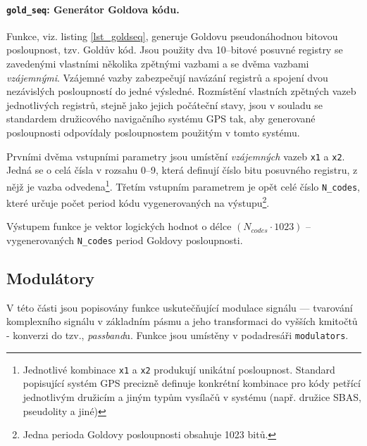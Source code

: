

\paragraph{\texttt{gold\_seq}: Generátor Goldova kódu.}
Funkce, viz. listing \ref{lst_goldseq}, generuje Goldovu pseudonáhodnou bitovou posloupnost, tzv. Goldův kód. Jsou použity dva 10--bitové posuvné registry se zavedenými vlastními několika zpětnými vazbami a se dvěma vazbami \textsl{vzájemnými}. Vzájemné vazby zabezpečují navázání registrů a spojení dvou nezávislých posloupností do jedné výsledné. Rozmístění vlastních zpětných vazeb jednotlivých registrů, stejně jako jejich počáteční stavy,  jsou v souladu se standardem družicového navigačního systému GPS tak, aby generované posloupnosti odpovídaly posloupnostem použitým v tomto systému.   

Prvními dvěma vstupními parametry jsou umístění \textsl{vzájemných} vazeb \texttt{x1} a \texttt{x2}. Jedná se o celá čísla v rozsahu 0--9, která definují číslo bitu posuvného registru, z nějž je vazba odvedena\footnote{Jednotlivé kombinace \texttt{x1} a \texttt{x2} produkují unikátní posloupnost. Standard popisující systém GPS precizně definuje konkrétní kombinace pro kódy petřící jednotlivým družicím a jiným typům vysílačů v systému (např. družice SBAS, pseudolity a jiné)}.  Třetím vstupním parametrem je opět celé číslo \texttt{N\_codes}, které určuje počet period kódu vygenerovaných na výstupu\footnote{Jedna perioda Goldovy posloupnosti obsahuje 1023 bitů.}. 

Výstupem funkce je vektor logických hodnot o délce $(N_{codes} \cdot 1023)$ -- vygenerovaných \texttt{N\_codes} period  Goldovy  posloupnosti.



\subsection{Modulátory}
V této části jsou popisovány funkce uskutečňující modulace signálu --- tvarování komplexního signálu v základním pásmu a jeho transformaci do vyšších kmitočtů - konverzi do tzv., \textsl{passband}u. Funkce jsou umístěny v podadresáři \texttt{modulators}.


